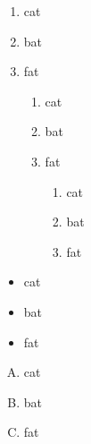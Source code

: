\documentclass[18px]{article}
\begin{document}
\begin{enumerate}
\item cat
\item bat
\item fat
	\begin{enumerate}
	\item cat
	\item bat
	\item fat
		\begin{enumerate}
		\item cat
		\item bat
		\item fat
		\end{enumerate}
	\end{enumerate}
\end{enumerate}

\begin{itemize}
\item cat
\item bat
\item fat
\end{itemize}


\begin{enumerate}[A.]
\item cat
\item bat
\item fat
\end{enumerate}
\end{document}
